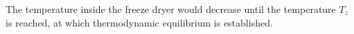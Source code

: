 The temperature inside the freeze dryer would decrease until the temperature \( T_z \) is reached, at which thermodynamic equilibrium is established.